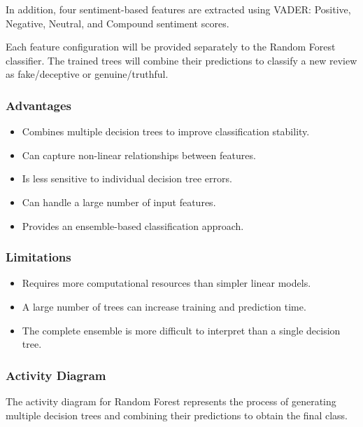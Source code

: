 \documentclass[12pt,a4paper]{report}
\begin{document}
In addition, four sentiment-based features are extracted using VADER: Positive, Negative, Neutral, and Compound sentiment scores.

Each feature configuration will be provided separately to the Random Forest classifier. The trained trees will combine their predictions to classify a new review as fake/deceptive or genuine/truthful.

\subsubsection*{Advantages}

\begin{itemize}
    \item Combines multiple decision trees to improve classification stability.
    \item Can capture non-linear relationships between features.
    \item Is less sensitive to individual decision tree errors.
    \item Can handle a large number of input features.
    \item Provides an ensemble-based classification approach.
\end{itemize}

\subsubsection*{Limitations}

\begin{itemize}
    \item Requires more computational resources than simpler linear models.
    \item A large number of trees can increase training and prediction time.
    \item The complete ensemble is more difficult to interpret than a single decision tree.
\end{itemize}

\subsubsection*{Activity Diagram}

The activity diagram for Random Forest represents the process of generating multiple decision trees and combining their predictions to obtain the final class.
\end{document}
